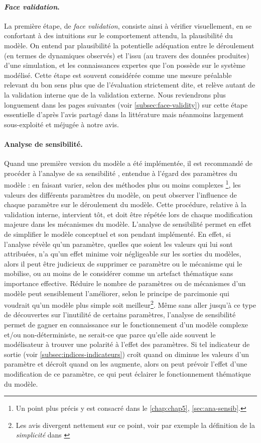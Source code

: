 \paragraph{\og \textit{Face validation}\fg{}.}
La première étape, de \og \textit{face validation}\fg{}, consiste ainsi à vérifier visuellement, en se confortant à des intuitions sur le comportement attendu, la plausibilité du modèle.
On entend par plausibilité la potentielle adéquation entre le déroulement (en termes de dynamiques observés) et l'issu (au travers des données produites) d'une simulation, et les connaissances expertes que l'on possède sur le système modélisé.
Cette étape est souvent considérée comme une mesure préalable relevant du bon sens plus que de l'évaluation strictement dite, et relève autant de la validation interne que de la validation externe.
Nous reviendrons plus longuement dans les pages suivantes (voir \cref{subsec:face-validity}) sur cette étape essentielle d'après l'avis partagé dans la littérature mais néanmoins largement sous-exploité et méjugée à notre avis.

\paragraph{Analyse de sensibilité.}
Quand une première version du modèle a été implémentée, il est recommandé de procéder à l'analyse de sa \og sensibilité \fg{}, entendue à l'égard des paramètres du modèle : en faisant varier, selon des méthodes plus ou moins complexes
\footnote{
	Un point plus précis y est consacré dans le \cref{chap:chap5}, \cref{sec:ana-sensib}.
}, les valeurs des différents paramètres du modèle, on peut observer l'influence de chaque paramètre sur le déroulement du modèle.
Cette procédure, relative à la validation interne, intervient tôt, et doit être répétée lors de chaque modification majeure dans les mécanismes du modèle.
L'analyse de sensibilité permet en effet de simplifier le modèle conceptuel et son pendant implémenté.
En effet, si l'analyse révèle qu'un paramètre, quelles que soient les valeurs qui lui sont attribuées, n'a qu'un effet minime voir négligeable sur les sorties du modèles, alors il peut être judicieux de supprimer ce paramètre ou le mécanisme qui le mobilise, ou au moins de le considérer comme un artefact thématique sans importance effective.
Réduire le nombre de paramètres ou de mécanismes d'un modèle peut sensiblement l'améliorer, selon le principe de parcimonie qui voudrait qu'un modèle plus simple soit meilleur\footnote{
	Les avis divergent nettement sur ce point, voir par exemple la définition de la \textit{simplicité} dans \textcite[120]{amblard_evaluation_2006}
}.
Même sans aller jusqu'à ce type de découvertes sur l'inutilité de certains paramètres, l'analyse de sensibilité permet de gagner en connaissance sur le fonctionnement d'un modèle complexe et/ou non-déterministe, ne serait-ce que parce qu'elle aide souvent le modélisateur à trouver une \og polarité \fg{} à l'effet des paramètres.
Si tel indicateur de sortie (voir \cref{subsec:indices-indicateurs}) croît quand on diminue les valeurs d'un paramètre et décroît quand on les augmente, alors on peut prévoir l'effet d'une modification de ce paramètre, ce qui peut éclairer le fonctionnement thématique du modèle.


